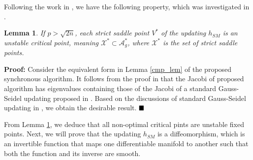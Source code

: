 \documentclass[journal]{IEEEtran}
\newtheorem{lemma}{Lemma}[section]
\newtheorem{assumption}{Assumption}[section]
\begin{document}
\par Following the work in \cite{saddle_escape}, we have the following property, which was investigated in \cite{wang2017mixing}.
\begin{lemma}\label{un_stable_fix}
	If $p>\sqrt{2n}$, each strict saddle point $V^*$ of the updating $h_{SM}$ is an unstable critical point, meaning $\mathcal{X}^*\subset \mathcal{A}_g^*$, where $\mathcal{X}^*$ is the set of strict saddle points.
\end{lemma}
\par\textbf{Proof:}
Consider the equivalent form in Lemma \ref{cmp_lem} of the proposed synchronous algorithm. It follows from the proof  in \cite{wang2017mixing} that  the Jacobi of proposed algorithm has eigenvalues containing those of the Jacobi of a standard Gauss-Seidel updating proposed in \cite{saddle_escape}. Based on the discussions of standard Gauss-Seidel updating in \cite{saddle_escape}, we obtain the desirable result.
$\hfill\blacksquare$
\par From Lemma \ref{un_stable_fix}, we deduce that all non-optimal critical pints are unstable fixed points. Next, we will prove that the updating $h_{SM}$ is a diffeomorphism, which is an invertible function that maps one differentiable manifold to another such that both the function and its inverse are smooth.
\end{document}
